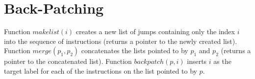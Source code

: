 \section{Back-Patching}
Function $makelist(i)$ creates a new list of jumps containing only the index $i$ into the sequence of instructions (returns a pointer to the newly created list).
Function $merge(p_1, p_2)$ concatenates the lists pointed to by $p_1$ and $p_2$ (returns a pointer to the concatenated list).
Function $backpatch(p, i)$ inserts $i$ as the target label for each of the instructions on the list pointed to by $p$.